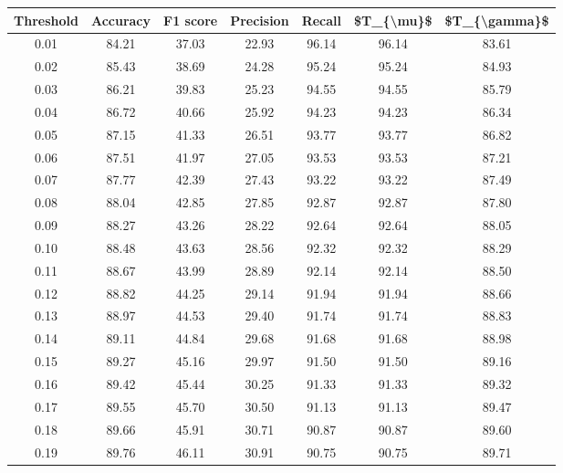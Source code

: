 \begin{tabular}{|c|c|c|c|c|c|c|}
\hline
 Threshold &  Accuracy &  F1 score &  Precision &  Recall &  \$T\_\{\textbackslash mu\}\$ &  \$T\_\{\textbackslash gamma\}\$ \\
\hline
      0.01 &     84.21 &     37.03 &      22.93 &   96.14 &      96.14 &         83.61 \\
      0.02 &     85.43 &     38.69 &      24.28 &   95.24 &      95.24 &         84.93 \\
      0.03 &     86.21 &     39.83 &      25.23 &   94.55 &      94.55 &         85.79 \\
      0.04 &     86.72 &     40.66 &      25.92 &   94.23 &      94.23 &         86.34 \\
      0.05 &     87.15 &     41.33 &      26.51 &   93.77 &      93.77 &         86.82 \\
      0.06 &     87.51 &     41.97 &      27.05 &   93.53 &      93.53 &         87.21 \\
      0.07 &     87.77 &     42.39 &      27.43 &   93.22 &      93.22 &         87.49 \\
      0.08 &     88.04 &     42.85 &      27.85 &   92.87 &      92.87 &         87.80 \\
      0.09 &     88.27 &     43.26 &      28.22 &   92.64 &      92.64 &         88.05 \\
      0.10 &     88.48 &     43.63 &      28.56 &   92.32 &      92.32 &         88.29 \\
      0.11 &     88.67 &     43.99 &      28.89 &   92.14 &      92.14 &         88.50 \\
      0.12 &     88.82 &     44.25 &      29.14 &   91.94 &      91.94 &         88.66 \\
      0.13 &     88.97 &     44.53 &      29.40 &   91.74 &      91.74 &         88.83 \\
      0.14 &     89.11 &     44.84 &      29.68 &   91.68 &      91.68 &         88.98 \\
      0.15 &     89.27 &     45.16 &      29.97 &   91.50 &      91.50 &         89.16 \\
      0.16 &     89.42 &     45.44 &      30.25 &   91.33 &      91.33 &         89.32 \\
      0.17 &     89.55 &     45.70 &      30.50 &   91.13 &      91.13 &         89.47 \\
      0.18 &     89.66 &     45.91 &      30.71 &   90.87 &      90.87 &         89.60 \\
      0.19 &     89.76 &     46.11 &      30.91 &   90.75 &      90.75 &         89.71 \\

\end{tabular}
